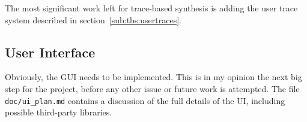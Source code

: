 \documentclass[nocopyrightspace,numbers,10pt]{sigplanconf}
\begin{document}
The most significant work left for trace-based synthesis is adding the user
trace system described in section~\ref{sub:tbs:usertraces}.

\subsection{User Interface}
\label{sub:future:ui}

Obviously, the GUI needs to be implemented. This is in my opinion the next big
step for the project, before any other issue or future work is attempted. The
file \texttt{doc/ui\_plan.md} contains a discussion of the full details of the
UI, including possible third-party libraries.

\printbibliography
\end{document}
